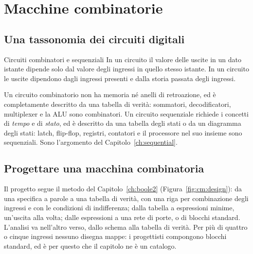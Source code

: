 \section{Macchine combinatorie}

\subsection{Una tassonomia dei circuiti digitali}

\begin{definition}{Circuiti combinatori e sequenziali}
In un circuito  il valore delle uscite in un dato istante
dipende solo dal valore degli ingressi in quello stesso istante. In un circuito
 le uscite dipendono dagli ingressi presenti e dalla storia
passata degli ingressi.
\end{definition}

Un circuito combinatorio non ha memoria né anelli di retroazione, ed è
completamente descritto da una tabella di verità: sommatori, decodificatori,
multiplexer e la ALU sono combinatori. Un circuito sequenziale richiede i
concetti di \emph{tempo} e di \emph{stato}, ed è descritto da una tabella degli
stati o da un diagramma degli stati: latch, flip-flop, registri, contatori e il
processore nel suo insieme sono sequenziali. Sono l'argomento del
Capitolo~\ref{ch:sequential}.

\subsection{Progettare una macchina combinatoria}

Il progetto segue il metodo del Capitolo~\ref{ch:boole2}
(Figura~\ref{fig:cm:design}): da una specifica a parole a una tabella di
verità, con una riga per combinazione degli ingressi e con le condizioni di
indifferenza; dalla tabella a espressioni minime, un'uscita alla volta; dalle
espressioni a una rete di porte, o di blocchi standard. L'analisi va nell'altro
verso, dallo schema alla tabella di verità. Per più di quattro o cinque
ingressi nessuno disegna mappe: i progettisti compongono blocchi standard, ed è
per questo che il capitolo ne è un catalogo.

